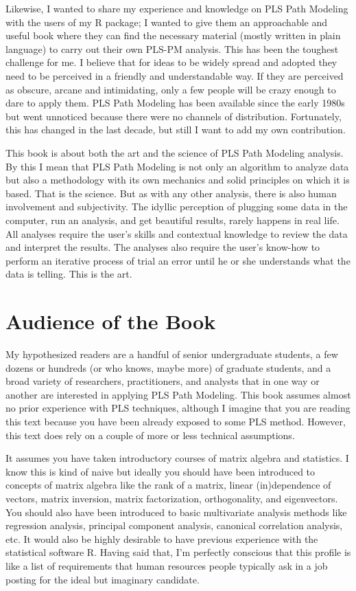\documentclass[12pt]{book}\usepackage{graphicx, color}
\begin{document}
Likewise, I wanted to share my experience and knowledge on PLS Path Modeling with the users of my R package; I wanted to give them an approachable and useful book where they can find the necessary material (mostly written in plain language) to carry out their own PLS-PM analysis. This has been the toughest challenge for me. I believe that for ideas to be widely spread and adopted they need to be perceived in a friendly and understandable way. If they are perceived as obscure, arcane and intimidating, only a few people will be crazy enough to dare to apply them. PLS Path Modeling has been available since the early 1980s but went unnoticed because there were no channels of distribution. Fortunately, this has changed in the last decade, but still I want to add my own contribution. 

This book is about both the art and the science of PLS Path Modeling analysis. By this I mean that PLS Path Modeling is not only an algorithm to analyze data but also a methodology with its own mechanics and solid principles on which it is based. That is the science. But as with any other analysis, there is also human involvement and subjectivity. The idyllic perception of plugging some data in the computer, run an analysis, and get beautiful results, rarely happens in real life. All analyses require the user's skills and contextual knowledge to review the data and interpret the results. The analyses also require the user's know-how to perform an iterative process of trial an error until he or she understands what the data is telling. This is the art. 


\section*{Audience of the Book}
My hypothesized readers are a handful of senior undergraduate students, a few dozens or hundreds (or who knows, maybe more) of graduate students, and a broad variety of researchers, practitioners, and analysts that in one way or another are interested in applying PLS Path Modeling. This book assumes almost no prior experience with PLS techniques, although I imagine that you are reading this text because you have been already exposed to some PLS method. However, this text does rely on a couple of more or less technical assumptions.

It assumes you have taken introductory courses of matrix algebra and statistics. I know this is kind of naive but ideally you should have been introduced to concepts of matrix algebra like the rank of a matrix, linear (in)dependence of vectors, matrix inversion, matrix factorization, orthogonality, and eigenvectors. You should also have been introduced to basic multivariate analysis methods like regression analysis, principal component analysis, canonical correlation analysis, etc. It would also be highly desirable to have previous experience with the statistical software R. Having said that, I'm perfectly conscious that this profile is like a list of requirements that human resources people typically ask in a job posting for the ideal but imaginary candidate.
\end{document}
